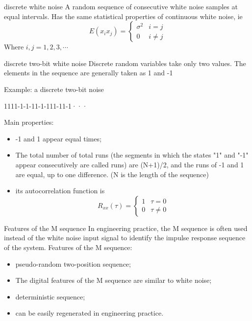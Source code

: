 \begin{frame}{discrete white noise}
A random sequence of consecutive white noise samples at equal intervals. Has the same statistical properties of continuous white noise, ie
$$
E(x_i x_j) =\begin{cases} \sigma^2 & i=j \\
0 & i\neq j\end{cases}
$$
Where $i,j=1,2,3,\cdots$
\end{frame}

\begin{frame}{discrete two-bit white noise}
Discrete random variables take only two values. The elements in the sequence are generally taken as 1 and -1

Example: a discrete two-bit noise

          1111-1-1-11-1-111-11-1···

Main properties:
\begin{itemize}
\item -1 and 1 appear equal times;
\item The total number of  total runs (the segments in which the states "1" and "-1" appear consecutively are called runs) are (N+1)/2, and the runs of -1 and 1 are equal, up to one difference. (N is the length of the sequence)
\item its autocorrelation function is
$$
R_{xx}(\tau) =\begin{cases} 1 & \tau=0 \\
0 & \tau \neq 0 \end{cases}
$$
\end{itemize}
\end{frame}

\begin{frame}{Features of the M sequence}
In engineering practice, the M sequence is often used instead of the white noise input signal to identify the impulse response sequence of the system. Features of the M sequence:
\begin{itemize}
\item pseudo-random two-position sequence;
\item The digital features of the  M sequence are similar to white noise;
\item deterministic sequence;
\item can be easily regenerated in engineering practice.
\end{itemize}
\end{frame}

